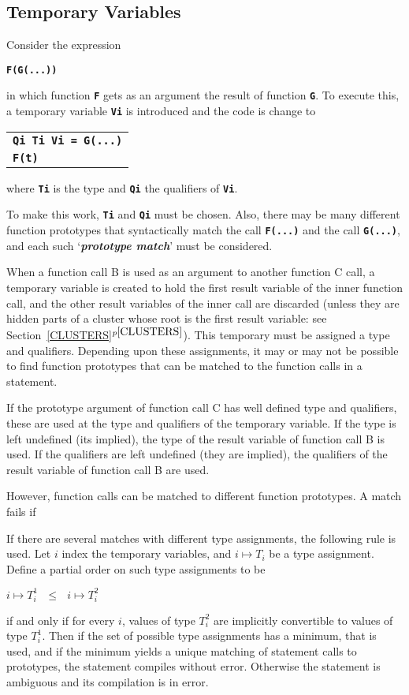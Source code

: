 \documentclass[12pt]{article}
\newcommand{\TT}[1]{{\tt \bfseries #1}}
\newcommand{\key}[1]{{\bf \em #1}\index{#1}}
\newcommand{\itemref}[1]{\ref{#1}$^{p\pageref{#1}}$}
\begin{document}
\subsection{Temporary Variables}
\label{TEMPORARY-VARIABLES}

Consider the expression
\begin{center}
\TT{F(G(...))}
\end{center}
in which function \TT{F} gets as an argument the result of
function \TT{G}.  To execute this, a temporary variable \TT{Vi}
is introduced and the code is change to
\begin{center}
\begin{tabular}{l}
\TT{Qi Ti Vi = G(...)} \\
\TT{F(t)}
\end{tabular}
\end{center}

where \TT{Ti} is the type and \TT{Qi} the qualifiers of \TT{Vi}.

To make this work, \TT{Ti} and \TT{Qi} must be chosen.
Also, there may be many different function prototypes that
syntactically match the call \TT{F(...)} and the call \TT{G(...)},
and each such `\key{prototype match}' must be considered.


When a function call B is used as an argument to another function C
call, a temporary variable is created to hold the first result
variable of the inner function call, and the other result variables
of the inner call are discarded (unless they are hidden parts
of a cluster whose root
is the first result variable: see Section~\itemref{CLUSTERS}).
This temporary must be assigned a type
and qualifiers.  Depending upon these assignments, it may or
may not be possible to find function prototypes that can be
matched to the function calls in a statement.

If the prototype argument of function call C has well defined
type and qualifiers, these are used at the type and qualifiers
of the temporary variable.  If the type is left undefined (its
implied), the type of the result variable of function call B is
used.  If the qualifiers are left undefined (they are implied),
the qualifiers of the result variable of function call B are used.

However, function calls can be matched to different function
prototypes.  A match fails if 

If there are several matches with different type assignments, the
following rule is used.  Let $i$ index the temporary variables,
and $i\mapsto T_i$ be a type assignment.  Define a partial order
on such type assignments to be
\begin{center}
$i\mapsto T^1_i~~~\leq~~~i\mapsto T^2_i$
\end{center}
if and only if for every $i$, values of type $T^2_i$ are implicitly
convertible to values of type $T^1_i$.  Then if the set of
possible type assignments has a minimum, that is used, and if
the minimum yields a unique matching of statement calls to
prototypes, the statement compiles without error.  Otherwise
the statement is ambiguous and its compilation is in error.
\end{document}
